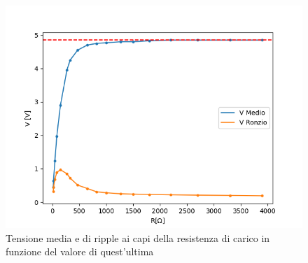 \begin{figure}[H]
	\centering
	\includegraphics[scale=0.5]{zenerripple.png}
	\caption{Tensione media e di ripple ai capi della resistenza di carico in funzione del valore di quest'ultima}
	\label{zenerstab}
\end{figure}

